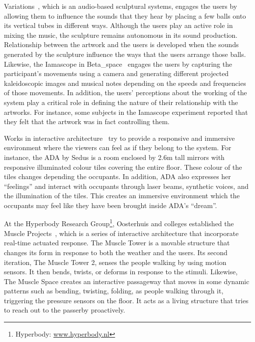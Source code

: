 Variations~\cite{Wands2005}, which is an audio-based sculptural systems, engages the users by allowing them to influence the sounds that they hear by placing a few balls onto its vertical tubes in different ways. Although the users play an active role in mixing the music, the sculpture remains autonomous in its sound production. Relationship between the artwork and the users is developed when the sounds generated by the sculpture influence the ways that the users arrange those balls. 
Likewise, the Iamascope in Beta\_space~\cite{Costello2005} engages the users by capturing the participant's movements using a camera and generating different projected kaleidoscopic images and musical notes depending on the speeds and frequencies of those movements. In addition, the users' perceptions about the working of the system play a critical role in defining the nature of their relationship with the artworks. For instance, some subjects in the Iamascope experiment reported that they felt that the artwork was in fact controlling them. 

Works in interactive architecture~\cite{Hangar.org}\cite{Fox2009} try to provide a responsive and immersive environment where the viewers can feel as if they belong to the system. For instance, the ADA by Sedus is a room enclosed by 2.6m tall mirrors with responsive illuminated colour tiles covering the entire floor. These colour of the tiles changes depending the occupants. In addition, ADA also expresses her ``feelings'' and interact with occupants through laser beams, synthetic voices, and the illumination of the tiles. This creates an immersive environment which the occupants may feel like they have been brought inside ADA's ``dream''. 

At the Hyperbody Research Group\footnote{Hyperbody: \url{www.hyperbody.nl}}, Oosterhuis and colleges established the Muscle Projects~\cite{Oosterhuis2008}, which is a series of interactive architecture that incorporate real-time actuated response. The Muscle Tower is a movable structure that changes its form in response to both the weather and the users. Its second iteration, The Muscle Tower 2, senses the people walking by using motion sensors. It then bends, twists, or deforms in response to the stimuli. Likewise, The Muscle Space creates an interactive passageway that moves in some dynamic patterns such as bending, twisting, folding, as people walking through it, triggering the pressure sensors on the floor. It acts as a living structure that tries to reach out to the passerby proactively.

